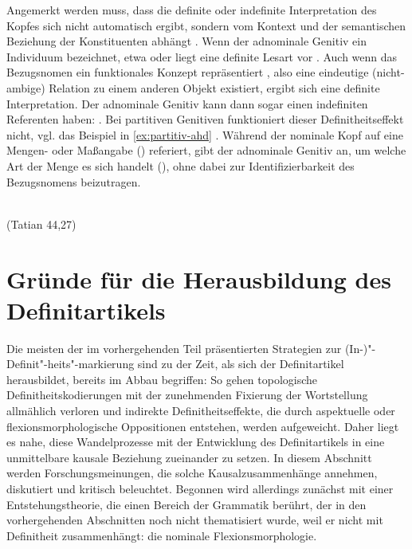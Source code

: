 \noindent
 Angemerkt werden muss, dass die definite oder indefinite Interpretation des Kopfes sich nicht automatisch ergibt, sondern vom Kontext und der semantischen Beziehung der Konstituenten abhängt \parencite[237]{Oubouzar1997}.
Wenn der adnominale Genitiv ein Individuum bezeichnet, etwa   oder   liegt eine definite Lesart vor \parencite[vgl. auch][194]{Szczepaniak2015}. Auch wenn das Bezugsnomen ein funktionales Konzept repräsentiert \parencite{Lobner1985}, also eine eindeutige (nicht-ambige) Relation zu einem anderen Objekt existiert, ergibt sich eine definite Interpretation. Der adnominale Genitiv kann dann sogar einen indefiniten Referenten haben:  \parencite[109]{Demske2001}. Bei partitiven Genitiven funktioniert dieser Definitheitseffekt nicht, vgl. das Beispiel in \ref{ex:partitiv-ahd} \parencite[s. auch][194]{Szczepaniak2015}. Während der nominale Kopf auf eine Mengen- oder Maßangabe () referiert, gibt der adnominale Genitiv an, um welche Art der Menge es sich handelt (), ohne dabei zur Identifizierbarkeit des Bezugsnomens beizutragen. 

\begin{exe}
	\ex \label{ex:partitiv-ahd}   
	  \\
	 (Tatian 44,27)
\end{exe}

\section{Gründe für die Herausbildung des Definitartikels}\label{sec:gruende}

Die meisten der im vorhergehenden Teil präsentierten Strategien zur (In-)"-Definit"-heits"-markierung sind zu der Zeit, als sich der Definitartikel herausbildet, bereits im Abbau begriffen: So gehen topologische Definitheitskodierungen mit der zunehmenden Fixierung der Wortstellung allmählich verloren und indirekte Definitheitseffekte, die durch aspektuelle oder flexionsmorphologische Oppositionen entstehen, werden aufgeweicht. Daher liegt es nahe, diese Wandelprozesse mit der Entwicklung des Definitartikels in eine unmittelbare kausale Beziehung zueinander zu setzen. In diesem Abschnitt werden Forschungsmeinungen, die solche Kausalzusammenhänge annehmen, diskutiert und kritisch beleuchtet. Begonnen wird allerdings zunächst mit einer Entstehungstheorie, die einen Bereich der Grammatik berührt, der in den vorhergehenden Abschnitten noch nicht thematisiert wurde, weil er nicht mit Definitheit zusammenhängt: die nominale Flexionsmorphologie. 

